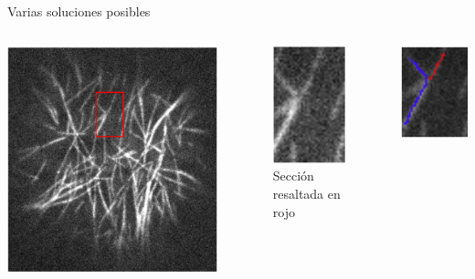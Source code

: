\documentclass[aspectratio=169]{beamer}
\begin{document}
\begin{frame}{Varias soluciones posibles}
  \begin{columns}
    \begin{column}{0.6\textwidth}
        \centering
        \includegraphics[scale=0.5]{Pictures/NoConsenso.png}
    \end{column}
    \hspace{-1.5cm}
    \begin{column}{0.2\textwidth}
        \begin{figure}
            \includegraphics[scale=0.5]{Pictures/NoConsenso2.png}
            \caption{Secci\'on resaltada en rojo}
        \end{figure}
    \end{column}
    \begin{column}{0.2\textwidth}
        \includegraphics[scale=0.5]{Pictures/NoConsenso3.png}

\end{column}
\end{columns}
\end{frame}
\end{document}
